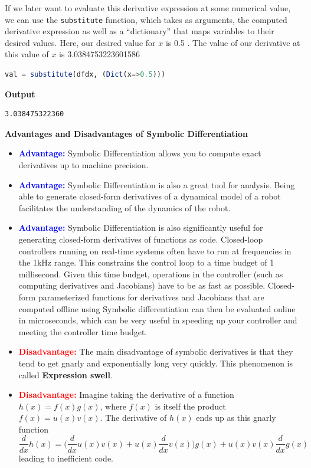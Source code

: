 If we later want to evaluate this derivative expression at some numerical value, we can use the \texttt{substitute} function, which takes as arguments, the computed derivative expression as well as a ``dictionary'' that maps variables to their desired values. Here, our desired value for $x$ is 0.5 . The value of our derivative at this value of $x$ is 3.0384753223601586

\begin{lstlisting}[language=Julia,style=mystyle]
val = substitute(dfdx, (Dict(x=>0.5)))
\end{lstlisting}
\textbf{Output} 
\begin{verbatim}
3.038475322360
\end{verbatim}

\begin{center} 
\textbf{Advantages and Disadvantages of Symbolic Differentiation}
\end{center}



\begin{itemize}
    \item \textcolor{blue}{\bf Advantage:} Symbolic Differentiation allows you to compute exact derivatives up to machine precision.
    \item \textcolor{blue}{\bf Advantage:} Symbolic Differentiation is also a great tool for analysis. Being able to generate closed-form derivatives of a dynamical model of a robot facilitates the understanding of the dynamics of the robot.
    \item \textcolor{blue}{\bf Advantage:} Symbolic Differentiation is also significantly useful for generating closed-form derivatives of functions as code. Closed-loop controllers running on real-time systems often have to run at frequencies in the 1kHz range. This constrains the control loop to a time budget of 1 millisecond. Given this time budget, operations in the controller (such as computing derivatives and Jacobians) have to be as fast as possible. Closed-form parameterized functions for derivatives and Jacobians that are computed offline using Symbolic differentiation can then be evaluated online in microseconds, which can be very useful in speeding up your controller and meeting the controller time budget.

    \item \textcolor{red}{\bf Disadvantage:} The main disadvantage of symbolic derivatives is that they tend to get gnarly and exponentially long very quickly. This phenomenon is called \textbf{Expression swell}. 
    \item \textcolor{red}{\bf Disadvantage:} Imagine taking the derivative of a function $h(x) = f(x)g(x)$, where $f(x)$ is itself the product $f(x) = u(x)v(x)$. The derivative of $h(x)$ ends up as this gnarly function $$\frac{d}{dx}h(x) = \Bigg(\frac{d}{dx}u(x)v(x) + u(x)\frac{d}{dx}v(x)\Bigg)g(x) + u(x)v(x)\frac{d}{dx}g(x)$$  leading to inefficient code.
\end{itemize}

